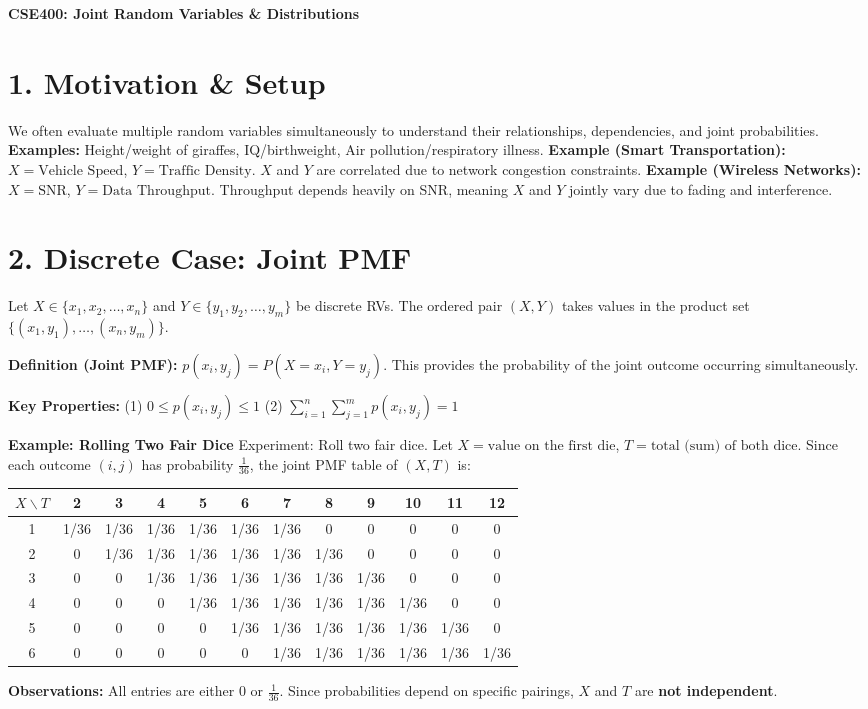 \documentclass{article}
\begin{document}
\begin{center}
\textbf{\Large CSE400: Joint Random Variables \& Distributions}
\end{center}

\section*{1. Motivation \& Setup}
We often evaluate multiple random variables simultaneously to understand their relationships, dependencies, and joint probabilities.
\textbf{Examples:} Height/weight of giraffes, IQ/birthweight, Air pollution/respiratory illness.
\textbf{Example (Smart Transportation):} $X = \text{Vehicle Speed}$, $Y = \text{Traffic Density}$. $X$ and $Y$ are correlated due to network congestion constraints. 
\textbf{Example (Wireless Networks):} $X = \text{SNR}$, $Y = \text{Data Throughput}$. Throughput depends heavily on SNR, meaning $X$ and $Y$ jointly vary due to fading and interference.

\section*{2. Discrete Case: Joint PMF}
Let $X \in \{x_1, x_2, \dots, x_n\}$ and $Y \in \{y_1, y_2, \dots, y_m\}$ be discrete RVs. The ordered pair $(X, Y)$ takes values in the product set $\{(x_1, y_1), \dots, (x_n, y_m)\}$.

\textbf{Definition (Joint PMF):} $p(x_i, y_j) = P(X = x_i, Y = y_j)$. This provides the probability of the joint outcome occurring simultaneously.

\textbf{Key Properties:}
\quad (1) $0 \le p(x_i, y_j) \le 1$ \qquad (2) $\sum_{i=1}^{n}\sum_{j=1}^{m} p(x_i, y_j) = 1$

\textbf{Example: Rolling Two Fair Dice}
Experiment: Roll two fair dice. Let $X = \text{value on the first die}$, $T = \text{total (sum) of both dice}$.
Since each outcome $(i, j)$ has probability $\frac{1}{36}$, the joint PMF table of $(X, T)$ is:

\begin{center}
\renewcommand{\arraystretch}{1.2}
\begin{tabular}{|c|ccccccccccc|}
\hline
$X \backslash T$ & 2 & 3 & 4 & 5 & 6 & 7 & 8 & 9 & 10 & 11 & 12 \\
\hline
1 & 1/36 & 1/36 & 1/36 & 1/36 & 1/36 & 1/36 & 0 & 0 & 0 & 0 & 0 \\
2 & 0 & 1/36 & 1/36 & 1/36 & 1/36 & 1/36 & 1/36 & 0 & 0 & 0 & 0 \\
3 & 0 & 0 & 1/36 & 1/36 & 1/36 & 1/36 & 1/36 & 1/36 & 0 & 0 & 0 \\
4 & 0 & 0 & 0 & 1/36 & 1/36 & 1/36 & 1/36 & 1/36 & 1/36 & 0 & 0 \\
5 & 0 & 0 & 0 & 0 & 1/36 & 1/36 & 1/36 & 1/36 & 1/36 & 1/36 & 0 \\
6 & 0 & 0 & 0 & 0 & 0 & 1/36 & 1/36 & 1/36 & 1/36 & 1/36 & 1/36 \\
\hline
\end{tabular}
\end{center}
\textbf{Observations:} All entries are either $0$ or $\frac{1}{36}$. Since probabilities depend on specific pairings, $X$ and $T$ are \textbf{not independent}.
\end{document}
